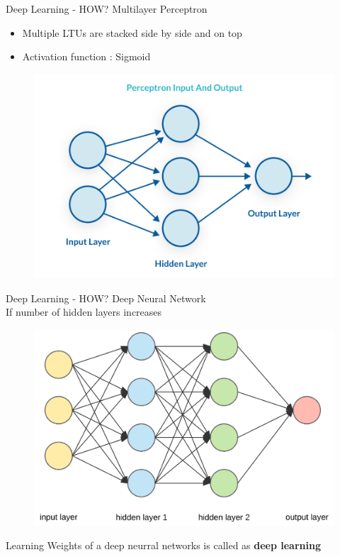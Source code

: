 \begin{frame}[fragile]{Deep Learning - HOW?}
    Multilayer Perceptron
    \begin{itemize}
        \item Multiple LTUs are stacked side by side and on top
\pause        
        \item Activation function : Sigmoid
    \end{itemize}
    \begin{figure}[ht]
      \hspace*{-1cm}\includegraphics[width=0.5\linewidth]{mlp}
    \end{figure}
\end{frame}

\begin{frame}[fragile]{Deep Learning - HOW?}
    Deep Neural Network \\ 
    If number of hidden layers increases
    \begin{figure}[ht]
      \hspace*{-1cm}\includegraphics[width=0.5\linewidth]{dnn}
    \end{figure}
Learning Weights of a deep neurral networks is called as \textbf{deep learning}
\end{frame}

